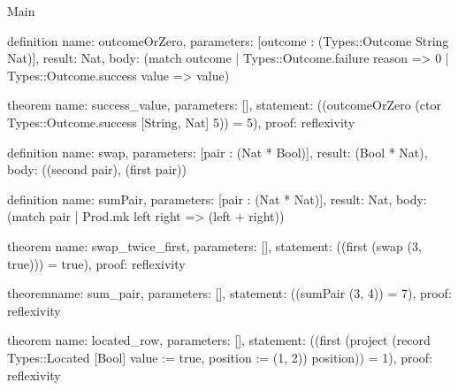\begin{lexlean}{Main}
\begin{semanticmodule}
definition{
  name: outcomeOrZero,
  parameters: [outcome : (Types::Outcome String Nat)],
  result: Nat,
  body: (match outcome | Types::Outcome.failure reason => 0 | Types::Outcome.success value => value)
}

theorem{
  name: success_value,
  parameters: [],
  statement: ((outcomeOrZero (ctor Types::Outcome.success [String, Nat] 5)) = 5),
  proof: reflexivity{}
}

definition{
  name: swap,
  parameters: [pair : (Nat * Bool)],
  result: (Bool * Nat),
  body: ((second pair), (first pair))
}

definition{
  name: sumPair,
  parameters: [pair : (Nat * Nat)],
  result: Nat,
  body: (match pair | Prod.mk left right => (left + right))
}

theorem{
  name: swap_twice_first,
  parameters: [],
  statement: ((first (swap (3, true))) = true),
  proof: reflexivity{}
}

theorem{name: sum_pair, parameters: [], statement: ((sumPair (3, 4)) = 7), proof: reflexivity{}}

theorem{
  name: located_row,
  parameters: [],
  statement: ((first (project (record Types::Located [Bool] {value := true, position := (1, 2)}) position)) = 1),
  proof: reflexivity{}
}
\end{semanticmodule}
\end{lexlean}
